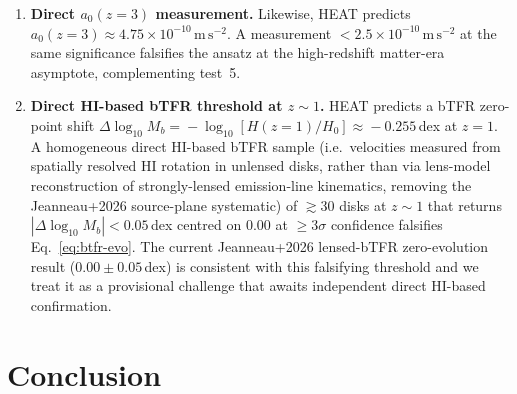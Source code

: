 \documentclass[twocolumn,letterpaper]{aastex631}
\newcommand{\azero}{a_0}
\begin{document}
\begin{enumerate}
    BTFR channels.
  \item \textbf{Direct $\azero(z\!=\!3)$ measurement.}  Likewise,
    HEAT predicts $\azero(z\!=\!3)\!\approx\!4.75\!\times\!
    10^{-10}\,\mathrm{m\,s^{-2}}$.  A measurement
    $<\!2.5\!\times\!10^{-10}\,\mathrm{m\,s^{-2}}$ at the same
    significance falsifies the ansatz at the high-redshift
    matter-era asymptote, complementing test~5.
  \item \textbf{Direct HI-based bTFR threshold at $z\!\sim\!1$.}
    HEAT predicts a bTFR zero-point shift
    $\Delta\log_{10}M_{b}\!=\!-\log_{10}[H(z\!=\!1)/H_{0}]\!\approx\!
    -0.255$\,dex at $z\!=\!1$.  A homogeneous direct HI-based
    bTFR sample (i.e.\ velocities measured from spatially
    resolved HI rotation in unlensed disks, rather than via
    lens-model reconstruction of strongly-lensed emission-line
    kinematics, removing the Jeanneau+2026 source-plane
    systematic) of
    $\gtrsim 30$ disks at $z\!\sim\!1$ that returns
    $|\Delta\log_{10}M_{b}|\!<\!0.05$\,dex centred on $0.00$ at
    $\geq 3\sigma$ confidence falsifies Eq.~\ref{eq:btfr-evo}.
    The current Jeanneau+2026 lensed-bTFR zero-evolution result
    ($0.00\!\pm\!0.05$\,dex) is consistent with this falsifying
    threshold and we treat it as a provisional challenge that
    awaits independent direct HI-based confirmation.
\end{enumerate}

\section{Conclusion}\label{sec:conclusions}
\end{document}
